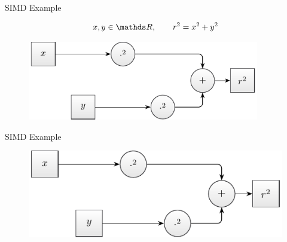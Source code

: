 \documentclass[aspectratio=169]{beamer}
\newcommand{\inputCodeBlock}[1]{%
    \begin{center}
        
    \end{center}
}
\begin{document}
    \begin{frame}{SIMD Example}
      \begin{mybox}
        \[
          x,y\in\setReal, \qquad r^2 = x^2 + y^2
        \]
      \end{mybox}
      \begin{minipage}{0.49\textwidth}
        \begin{figure}
          \includegraphics[width=0.9\textwidth]{figures/radius_operation.pdf}
        \end{figure}
      \end{minipage}
      \begin{minipage}{0.49\textwidth}
        \inputCodeBlock{code/simd_example_scalar.cpp}
      \end{minipage}
    \end{frame}

    \begin{frame}{SIMD Example}
      \begin{figure}
        \includegraphics[scale=0.9]{figures/radius_operation.pdf}
      \end{figure}
    \end{frame}
\end{document}
